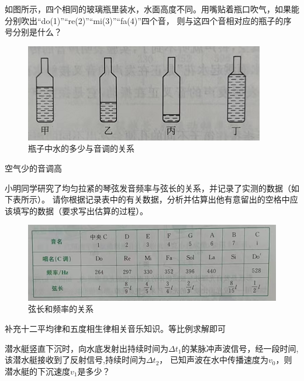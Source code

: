 \documentclass[windows,csize4]{BHCexam}
\begin{document}
\begin{groups}
\begin{questions}[]
        \question[5] 如图所示，四个相同的玻璃瓶里装水，水面高度不同。用嘴贴着瓶口吹气，如果能分别吹出“do(1)”“re(2)”“mi(3)”“fa(4)”四个音，
        则与这四个音相对应的瓶子的序号分别是什么？
        \begin{figure}[htb]
            \centering
            \includegraphics [scale=0.75,trim=0 0 0 0]{./image/fig_2_9.PNG}
            \caption{瓶子中水的多少与音调的关系}
            \label{fig:fig_2_9}
        \end{figure}
        \begin{solution}{0.5cm}
            \methodonly 空气少的音调高
        \end{solution}

        \question[5] 小明同学研究了均匀拉紧的琴弦发音频率与弦长的关系，并记录了实测的数据（如下表所示）。
        请你根据记录表中的有关数据，分析并估算出他有意留出的空格中应该填写的数据（要求写出估算的过程）。
        \begin{figure}[htb]
            \centering
            \includegraphics [scale=0.6,trim=0 0 0 0]{./image/fig_2_10.PNG}
            \caption{弦长和频率的关系}
            \label{fig:fig_2_10}
        \end{figure}
        \begin{solution}{0.5cm}
            \methodonly 补充十二平均律和五度相生律相关音乐知识。等比例求解即可
        \end{solution}



    \end{questions}

    \begin{questions}[]
        \question[5] 潜水艇竖直下沉时，向水底发射出持续时间为$\Delta t_1$的某脉冲声波信号，经一段时间,该潜水艇接收到了反射信号,持续时间为$\Delta t_2$，
        已知声波在水中传播速度为$v_0$，则潜水艇的下沉速度$v_1$是多少？


\end{questions}
\end{groups}
\end{document}
